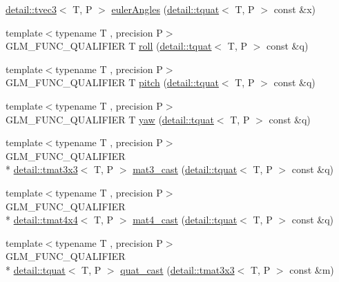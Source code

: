 \begin{DoxyCompactItemize}
\hyperlink{structglm_1_1detail_1_1tvec3}{detail\-::tvec3}$<$ T, P $>$ \hyperlink{group__gtc__quaternion_gade4034f49ccadf63cb31a7fb5fa3c8aa}{euler\-Angles} (\hyperlink{structglm_1_1detail_1_1tquat}{detail\-::tquat}$<$ T, P $>$ const \&x)
\item 
{\footnotesize template$<$typename T , precision P$>$ }\\G\-L\-M\-\_\-\-F\-U\-N\-C\-\_\-\-Q\-U\-A\-L\-I\-F\-I\-E\-R T \hyperlink{group__gtc__quaternion_ga6d883e423bc425f4334fcce202131f7e}{roll} (\hyperlink{structglm_1_1detail_1_1tquat}{detail\-::tquat}$<$ T, P $>$ const \&q)
\item 
{\footnotesize template$<$typename T , precision P$>$ }\\G\-L\-M\-\_\-\-F\-U\-N\-C\-\_\-\-Q\-U\-A\-L\-I\-F\-I\-E\-R T \hyperlink{group__gtc__quaternion_ga4d345dc369a54f53f5ebc375bac56d11}{pitch} (\hyperlink{structglm_1_1detail_1_1tquat}{detail\-::tquat}$<$ T, P $>$ const \&q)
\item 
{\footnotesize template$<$typename T , precision P$>$ }\\G\-L\-M\-\_\-\-F\-U\-N\-C\-\_\-\-Q\-U\-A\-L\-I\-F\-I\-E\-R T \hyperlink{group__gtc__quaternion_ga1de7653ddf380ff06d2300eea831664c}{yaw} (\hyperlink{structglm_1_1detail_1_1tquat}{detail\-::tquat}$<$ T, P $>$ const \&q)
\item 
{\footnotesize template$<$typename T , precision P$>$ }\\G\-L\-M\-\_\-\-F\-U\-N\-C\-\_\-\-Q\-U\-A\-L\-I\-F\-I\-E\-R \\*
\hyperlink{structglm_1_1detail_1_1tmat3x3}{detail\-::tmat3x3}$<$ T, P $>$ \hyperlink{group__gtc__quaternion_ga65257c3494022ad80a50ce11da95049d}{mat3\-\_\-cast} (\hyperlink{structglm_1_1detail_1_1tquat}{detail\-::tquat}$<$ T, P $>$ const \&q)
\item 
{\footnotesize template$<$typename T , precision P$>$ }\\G\-L\-M\-\_\-\-F\-U\-N\-C\-\_\-\-Q\-U\-A\-L\-I\-F\-I\-E\-R \\*
\hyperlink{structglm_1_1detail_1_1tmat4x4}{detail\-::tmat4x4}$<$ T, P $>$ \hyperlink{group__gtc__quaternion_gafc4e34c836f7ccb5f3bb2a0373c831e0}{mat4\-\_\-cast} (\hyperlink{structglm_1_1detail_1_1tquat}{detail\-::tquat}$<$ T, P $>$ const \&q)
\item 
{\footnotesize template$<$typename T , precision P$>$ }\\G\-L\-M\-\_\-\-F\-U\-N\-C\-\_\-\-Q\-U\-A\-L\-I\-F\-I\-E\-R \\*
\hyperlink{structglm_1_1detail_1_1tquat}{detail\-::tquat}$<$ T, P $>$ \hyperlink{group__gtc__quaternion_gafb826745dedb1760100bbd25d0f63fde}{quat\-\_\-cast} (\hyperlink{structglm_1_1detail_1_1tmat3x3}{detail\-::tmat3x3}$<$ T, P $>$ const \&m)

\end{DoxyCompactItemize}
